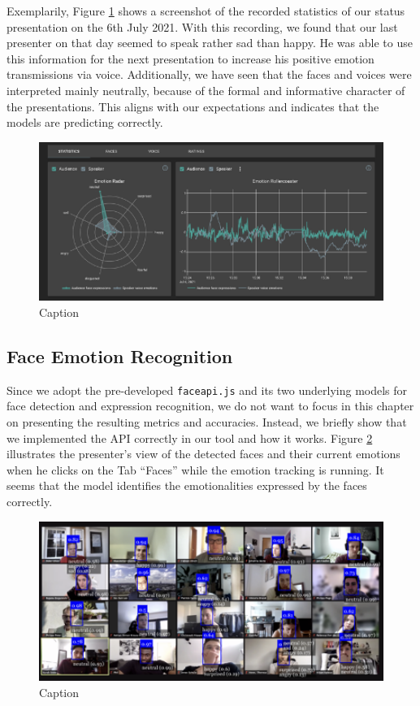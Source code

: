 Exemplarily, Figure \ref{fig:moody_statistics_screenshot} shows a screenshot of the recorded statistics of our status presentation on the 6th July 2021. With this recording, we found that our last presenter on that day seemed to speak rather sad than happy. He was able to use this information for the next presentation to increase his positive emotion transmissions via voice. Additionally, we have seen that the faces and voices were interpreted mainly neutrally, because of the formal and informative character of the presentations. This aligns with our expectations and indicates that the models are predicting correctly.

\begin{figure}
\centering
\includegraphics[width=1\textwidth]{assets/moody_statistics_screenshot.png}
\caption{Caption}
\label{fig:moody_statistics_screenshot}
\end{figure}

\subsection{Face Emotion Recognition}
\label{subsec:results_face_emotion_recognition}
Since we adopt the pre-developed \texttt{faceapi.js} and its two underlying models for face detection and expression recognition, we do not want to focus in this chapter on presenting the resulting metrics and accuracies. Instead, we briefly show that we implemented the API correctly in our tool and how it works. Figure \ref{fig:moody_faces_screenshot} illustrates the presenter's view of the detected faces and their current emotions when he clicks on the Tab ``Faces'' while the emotion tracking is running. It seems that the model identifies the emotionalities expressed by the faces correctly.

\begin{figure}
\centering
\includegraphics[width=1\textwidth]{assets/moody_faces_screenshot.png}
\caption{Caption}
\label{fig:moody_faces_screenshot}
\end{figure}

